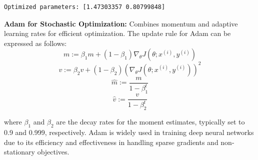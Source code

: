 \documentclass[
  letterpaper,
  DIV=11,
  numbers=noendperiod]{scrreprt}
\begin{document}
\begin{verbatim}
Optimized parameters: [1.47303357 0.80799848]
\end{verbatim}

\textbf{Adam for Stochastic Optimization:} Combines momentum and
adaptive learning rates for efficient optimization. The update rule for
Adam can be expressed as follows:
\[m := \beta_1 m + (1 - \beta_1) \nabla_\theta J(\theta; x^{(i)}, y^{(i)})\]
\[v := \beta_2 v + (1 - \beta_2) (\nabla_\theta J(\theta; x^{(i)}, y^{(i)}))^2\]
\[\hat{m} := \frac{m}{1 - \beta_1^t}\]
\[\hat{v} := \frac{v}{1 - \beta_2^t}\]

where \(\beta_1\) and \(\beta_2\) are the decay rates for the moment
estimates, typically set to 0.9 and 0.999, respectively. Adam is widely
used in training deep neural networks due to its efficiency and
effectiveness in handling sparse gradients and non-stationary
objectives.
\end{document}
